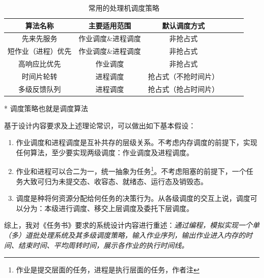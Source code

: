 \documentclass[UTF8]{ctexart}
\begin{document}
\begin{table}[htbp]
    \caption{常用的处理机调度策略}
    \centering

    \begin{threeparttable}
        \begin{tabular}{cccccc}
            \toprule
            算法名称           & 主要适用范围       & 默认调度方式         \\
            \midrule
            先来先服务         & 作业调度\&进程调度 & 非抢占式             \\
            短作业（进程）优先 & 作业调度\&进程调度 & 非抢占式             \\
            高响应比优先       & 作业调度           & 非抢占式             \\
            时间片轮转         & 进程调度           & 抢占式（不抢时间片） \\
            多级反馈队列       & 进程调度           & 抢占式（抢占时间片） \\
            \bottomrule
        \end{tabular}

        \begin{tablenotes}
            \item [*]   调度策略也就是调度算法
        \end{tablenotes}

    \end{threeparttable}
    \qquad
\end{table}

基于设计内容要求及上述理论常识，可以做出如下基本假设：
\begin{enumerate}
    \item 作业调度和进程调度是互补共存的层级关系。不考虑内存调度的前提下，实现任何算法，至少要实现两级调度：作业调度及进程调度。
    \item 作业和进程可以合二为一，统一抽象为任务\footnote{作业是提交层面的任务，进程是执行层面的任务，作者注}。不考虑阻塞的前提下，一个任务大致可归为未提交态、收容态、就绪态、运行态及销毁态。
    \item 调度是种将何资源分配给何任务的决策行为。从各级调度的交互上说，调度可以分为：本级进行调度、移交上层调度及委托下层调度。
\end{enumerate}

综上，我对《任务书》要求的系统设计内容进行重述：\emph{通过编程，模拟实现一个单（多）道批处理系统及其多级调度策略，输入作业序列，输出作业进入内存的时间、结束时间、平均周转时间，展示各作业的执行时间线。}
\end{document}
